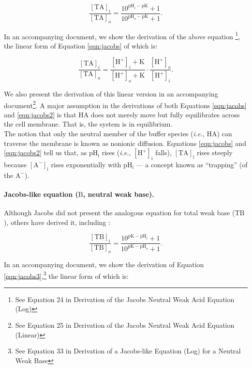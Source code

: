 \documentclass[fleqn,10pt]{physiome}
\begin{document}
\begin{equation}
\dfrac{\mathrm{[TA]}_i}{\mathrm{[TA]}_o}=\dfrac{10^{\mathrm{pH}_i-\mathrm{pK}}+1}{10^{\mathrm{pH}_o-\mathrm{pK}}+1}.
\label{eqn:jacobs}
\end{equation}

In an accompanying document, we show the derivation of the above equation \footnote{See Equation 24 in Derivation of the Jacobs Neutral Weak Acid Equation (Log)}, the linear form of Equation \ref{eqn:jacobs} of which is:

\begin{equation}
\dfrac{\mathrm{[TA]}_i}{\mathrm{[TA]}_o}=\dfrac{\mathrm{[H^+]}_i+\mathrm{K}}{\mathrm{[H^+]}_o+\mathrm{K}}\cdot \dfrac{\mathrm{[H^+]}_o}{\mathrm{[H^+]}_i}.
\label{eqn:jacobs2}
\end{equation}

We also present the derivation of this linear version in an accompanying document\footnote{See Equation 25 in Derivation of the Jacobs Neutral Weak Acid Equation (Linear)}. A major assumption in the derivations of both Equations \ref{eqn:jacobs} and \ref{eqn:jacobs2} is that $\mathrm{HA}$ does not merely move but fully equilibrates across the cell membrane. That is, the system is in equilibrium.\\

The notion that only the neutral member of the buffer species (\emph{i.e.}, $\mathrm{HA}$) can traverse the membrane is known as nonionic diffusion. Equations \ref{eqn:jacobs} and \ref{eqn:jacobs2} tell us that, as $\mathrm{pH_i}$ rises (\emph{i.e.}, $\mathrm{[H^+]_i}$ falls), $\mathrm{[TA]_i}$ rises steeply because $\mathrm{[A^-]_i}$ rises exponentially with $\mathrm{pH_i}$ --- a concept known as ``trapping'' (of the $\mathrm{A^-}$).

\paragraph{Jacobs-like equation ($\mathrm{B}$, neutral weak base).} Although Jacobs did not present the analogous equation for total weak base ($\mathrm{TB}$), others have derived it, including \cite{roos1981intracellular}:

\begin{equation}
\dfrac{\mathrm{[TB]}_i}{\mathrm{[TB]}_o}=\dfrac{10^{\mathrm{pK}-\mathrm{pH}_i}+1}{10^{\mathrm{pK}-\mathrm{pH}_o}+1}.
\label{eqn:jacobs3}
\end{equation}

In an accompanying document, we show the derivation of Equation \ref{eqn:jacobs3},\footnote{See Equation 33 in Derivation of a Jacobs-like Equation (Log) for a Neutral Weak Base} the linear form of which is:
\end{document}
